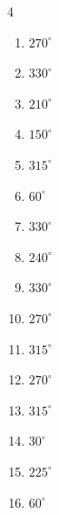 \begin{multicols}{4}
\begin{enumerate}
  \item $\displaystyle 270^{\circ}$

  \item $\displaystyle 330^{\circ}$

  \item $\displaystyle 210^{\circ}$

  \item $\displaystyle 150^{\circ}$

  \item $\displaystyle 315^{\circ}$

  \item $\displaystyle 60^{\circ}$

  \item $\displaystyle 330^{\circ}$

  \item $\displaystyle 240^{\circ}$

  \item $\displaystyle 330^{\circ}$

  \item $\displaystyle 270^{\circ}$

  \item $\displaystyle 315^{\circ}$

  \item $\displaystyle 270^{\circ}$

  \item $\displaystyle 315^{\circ}$

  \item $\displaystyle 30^{\circ}$

  \item $\displaystyle 225^{\circ}$

  \item $\displaystyle 60^{\circ}$


\end{enumerate}
\end{multicols}
